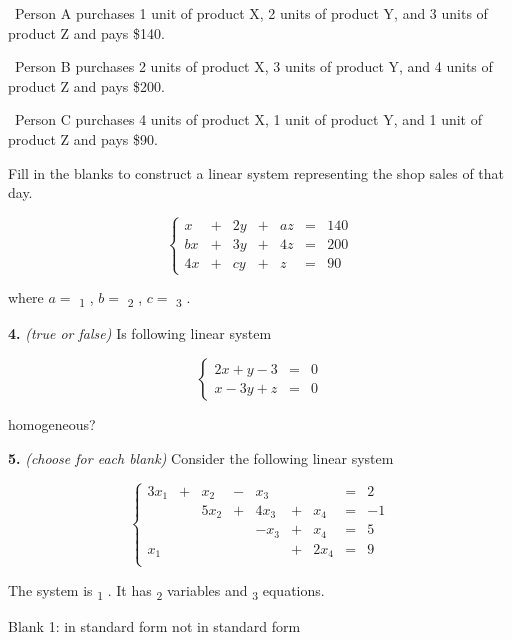 \documentclass[10pt,a4paper]{article}
\begin{document}
\quad\textbullet\ Person A purchases 1 unit of product X, 2 units of product Y, and 3 units of product Z and pays \$140.

\quad\textbullet\ Person B purchases 2 units of product X, 3 units of product Y, and 4 units of product Z and pays \$200.

\quad\textbullet\ Person C purchases 4 units of product X, 1 unit of product Y, and 1 unit of product Z and pays \$90.

Fill in the blanks to construct a linear system representing the shop sales of that day.

\[\left\{\begin{array}{ccccccc} x&+&2y&+&az&=&140\\ bx&+&3y&+&4z&=&200\\ 4x&+&cy&+&z&=&90\end{array}\right.\]

where \(a=\) \underline{\hspace{1.2cm}}\textsubscript{1} 
, \(b=\) \underline{\hspace{1.2cm}}\textsubscript{2} 
, \(c=\) \underline{\hspace{1.2cm}}\textsubscript{3} 
.

\smallskip
\textbf{4.} \textit{(true or false)} Is following linear system

\[\left\{\begin{array}{rrr}2x+y-3&=&0\\x-3y+z&=&0\end{array}\right.\]

homogeneous?

\smallskip
\textbf{5.} \textit{(choose for each blank)} Consider the following linear system

\[\left\{\begin{array}{rrrrrrrrr} 3x_1&+&x_2&-&x_3&&&=&2\\ &&5x_2&+&4x_3&+&x_4&=&-1\\ &&&&-x_3&+&x_4&=&5\\ x_1&&&&&+&2x_4&=&9\\ \end{array}\right.\]

The system is  \underline{\hspace{1.2cm}}\textsubscript{1} 
. It has  \underline{\hspace{1.2cm}}\textsubscript{2} 
 variables and  \underline{\hspace{1.2cm}}\textsubscript{3} 
 equations.

\quad Blank 1: in standard form \textbar{} not in standard form
\end{document}
